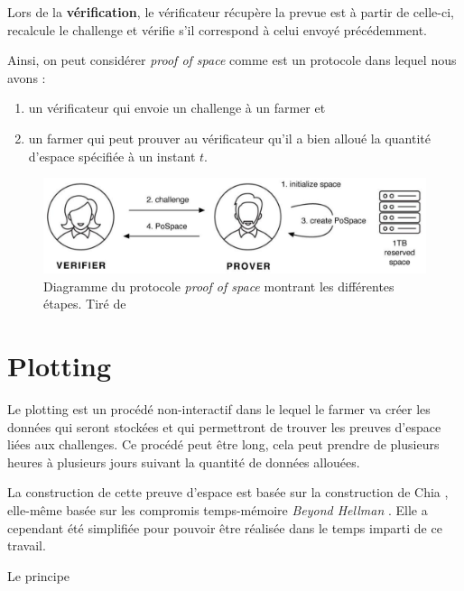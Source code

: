 \documentclass[../tb_report.tex]{subfiles}
\begin{document}
Lors de la \textbf{vérification}, le vérificateur récupère la prevue est à partir de celle-ci, recalcule le challenge et vérifie s'il correspond à celui envoyé précédemment.

Ainsi, on peut considérer \emph{proof of space} comme est un protocole dans lequel nous avons :

\begin{enumerate}
  \item un vérificateur qui envoie un challenge à un farmer et
  \item un farmer qui peut prouver au vérificateur qu'il a bien alloué la quantité d'espace spécifiée à un instant $t$.
\end{enumerate}

\begin{figure}[H]
  \centering
  \includegraphics[width=\textwidth]{images/pospace.png}
  \caption{Diagramme du protocole \emph{proof of space} montrant les différentes étapes. Tiré de \cite{chia:consensus}}
\end{figure}

\section{Plotting}

Le plotting est un procédé non-interactif dans le lequel le farmer va créer les données qui seront stockées et qui permettront de trouver les preuves d'espace liées aux challenges. Ce procédé peut être long, cela peut prendre de plusieurs heures à plusieurs jours suivant la quantité de données allouées.

La construction de cette preuve d'espace est basée sur la construction de Chia \cite{chia:construction}, elle-même basée sur les compromis temps-mémoire \emph{Beyond Hellman} \cite{DBLP:conf/asiacrypt/AbusalahACKPR17}. Elle a cependant été simplifiée pour pouvoir être réalisée dans le temps imparti de ce travail. 

Le principe
\end{document}
